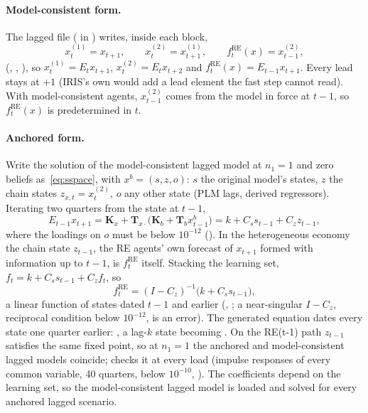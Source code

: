 \documentclass[11pt,a4paper]{article}
\newcommand{\RE}{\mathrm{RE}}
\newcommand{\fRE}{f^{\RE}}
\newcommand{\T}{\mathbf{T}}
\newcommand{\K}{\mathbf{K}}
\begin{document}
\paragraph{Model-consistent form.} The lagged file ( in
) writes, inside each  block,
\begin{equation}\label{eq:chain}
  x^{(1)}_t = x_{t+1}, \qquad x^{(2)}_t = x^{(1)}_{t+1}, \qquad \fRE_t(x) = x^{(2)}_{t-1},
\end{equation}
(, , ), so
$x^{(1)}_t = E_tx_{t+1}$, $x^{(2)}_t = E_tx_{t+2}$ and $\fRE_t(x) = E_{t-1}x_{t+1}$. Every lead stays
at $+1$ (IRIS's own  would add a lead element the fast step cannot read). With
model-consistent agents, $x^{(2)}_{t-1}$ comes from the model in force at $t-1$, so $\fRE_t(x)$ is
predetermined in $t$.

\paragraph{Anchored form.} Write the solution of the model-consistent lagged model at $n_1=1$ and
zero beliefs as~\eqref{eq:sspace}, with $x^b = (s, z, o)$: $s$ the original model's states, $z$ the
chain states $z_{x,t} = x^{(2)}_t$, $o$ any other state (PLM lags, derived regressors). Iterating
two quarters from the state at $t-1$,
\begin{equation}
  E_{t-1}x_{t+1} = \K_x + \T_{x\cdot}\bigl(\K_b + \T_b x^b_{t-1}\bigr) = k + C_s s_{t-1} + C_z z_{t-1},
\end{equation}
where the loadings on $o$ must be below $10^{-12}$ (). In the
heterogeneous economy the chain state $z_{t-1}$, the RE agents' own forecast of $x_{t+1}$ formed
with information up to $t-1$, is $\fRE_t$ itself. Stacking the learning set,
$f_t = k + C_s s_{t-1} + C_z f_t$, so
\begin{equation}\label{eq:anchoredlag}
  \fRE_t = (I - C_z)^{-1}\bigl(k + C_s s_{t-1}\bigr),
\end{equation}
a linear function of states dated $t-1$ and earlier (,
; a near-singular $I-C_z$, reciprocal condition below $10^{-12}$, is an
error). The generated equation dates every state one quarter earlier:
, a lag-$k$ state becoming
. On the RE(t-1) path $z_{t-1}$ satisfies the same fixed point, so at $n_1 = 1$ the
anchored and model-consistent lagged models coincide;  checks it at
every load (impulse responses of every common variable, 40 quarters, below $10^{-10}$,
). The coefficients depend on the learning set, so the model-consistent
lagged model is loaded and solved for every anchored lagged scenario.
\end{document}
